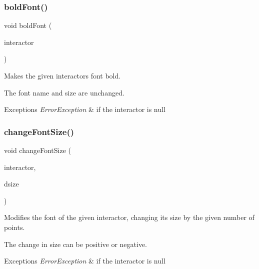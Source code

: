 \subsubsection{\texorpdfstring{bold\+Font()}{boldFont()}}
{\footnotesize\ttfamily void bold\+Font (\begin{DoxyParamCaption}\item[{\mbox{\hyperlink{classsgl_1_1GInteractor}{G\+Interactor}} $\ast$}]{interactor }\end{DoxyParamCaption})\hspace{0.3cm}{\ttfamily [static]}}



Makes the given interactor\textquotesingle{}s font bold. 

The font name and size are unchanged. 
\begin{DoxyExceptions}{Exceptions}
{\em Error\+Exception} & if the interactor is null \\
\hline
\end{DoxyExceptions}
\mbox{\label{classsgl_1_1GFont_ae6714d087455b3431d6dce6f1202659f}} 
\subsubsection{\texorpdfstring{change\+Font\+Size()}{changeFontSize()}\hspace{0.1cm}{\footnotesize\ttfamily [1/3]}}
{\footnotesize\ttfamily void change\+Font\+Size (\begin{DoxyParamCaption}\item[{\mbox{\hyperlink{classsgl_1_1GInteractor}{G\+Interactor}} $\ast$}]{interactor,  }\item[{int}]{dsize }\end{DoxyParamCaption})\hspace{0.3cm}{\ttfamily [static]}}



Modifies the font of the given interactor, changing its size by the given number of points. 

The change in size can be positive or negative. 
\begin{DoxyExceptions}{Exceptions}
{\em Error\+Exception} & if the interactor is null \\
\hline
\end{DoxyExceptions}
\mbox{\label{classsgl_1_1GFont_a8efb627bfbb3c5dddb8453dd8668880a}} 
